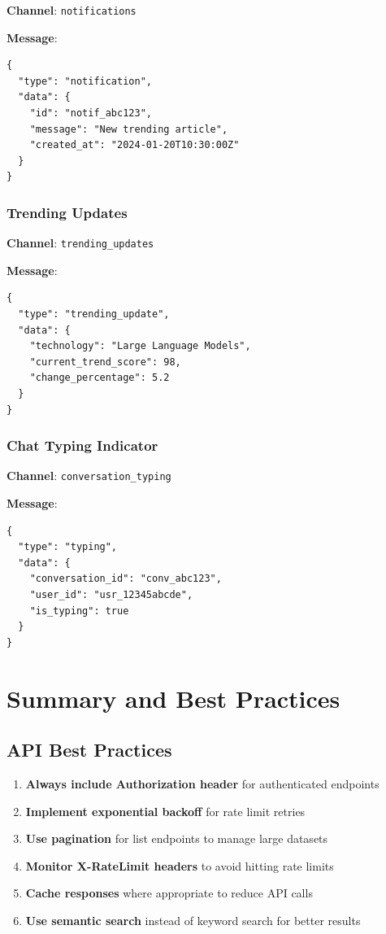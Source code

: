 \documentclass[12pt,a4paper]{report}
\begin{document}
\textbf{Channel}: \texttt{notifications}

\textbf{Message}:
\begin{lstlisting}
{
  "type": "notification",
  "data": {
    "id": "notif_abc123",
    "message": "New trending article",
    "created_at": "2024-01-20T10:30:00Z"
  }
}
\end{lstlisting}

\subsection{Trending Updates}

\textbf{Channel}: \texttt{trending\_updates}

\textbf{Message}:
\begin{lstlisting}
{
  "type": "trending_update",
  "data": {
    "technology": "Large Language Models",
    "current_trend_score": 98,
    "change_percentage": 5.2
  }
}
\end{lstlisting}

\subsection{Chat Typing Indicator}

\textbf{Channel}: \texttt{conversation\_typing}

\textbf{Message}:
\begin{lstlisting}
{
  "type": "typing",
  "data": {
    "conversation_id": "conv_abc123",
    "user_id": "usr_12345abcde",
    "is_typing": true
  }
}
\end{lstlisting}

\chapter{Summary and Best Practices}

\section{API Best Practices}

\begin{enumerate}
    \item \textbf{Always include Authorization header} for authenticated endpoints
    \item \textbf{Implement exponential backoff} for rate limit retries
    \item \textbf{Use pagination} for list endpoints to manage large datasets
    \item \textbf{Monitor X-RateLimit headers} to avoid hitting rate limits
    \item \textbf{Cache responses} where appropriate to reduce API calls
    \item \textbf{Use semantic search} instead of keyword search for better results
\end{enumerate}
\end{document}
